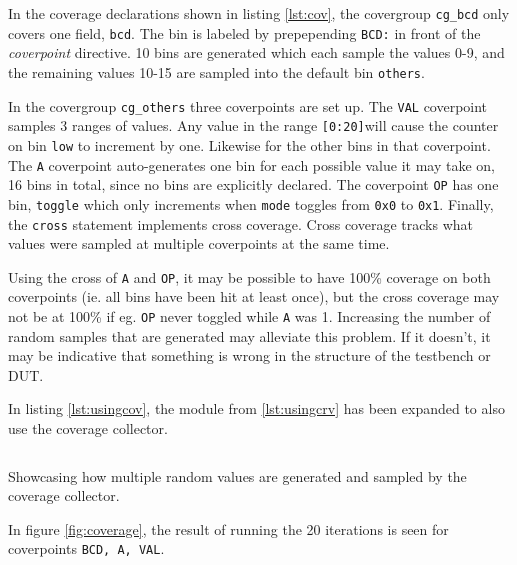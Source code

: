 \documentclass[conference]{IEEEtran}
\begin{document}
In the coverage declarations shown in listing \ref{lst:cov}, the covergroup \texttt{cg\_bcd} only covers one field, \texttt{bcd}. The bin is labeled by prepepending \texttt{BCD:} in front of the \textit{coverpoint} directive. 10 bins are generated which each sample the values 0-9, and the remaining values 10-15 are sampled into the default bin \texttt{others}. 

In the covergroup \texttt{cg\_others} three coverpoints are set up. The \texttt{VAL} coverpoint samples 3 ranges of values. Any value in the range \texttt{[0:20]}will cause the counter on bin \texttt{low} to increment by one. Likewise for the other bins in that coverpoint. The \texttt{A} coverpoint auto-generates one bin for each possible value it may take on, 16 bins in total, since no bins are explicitly declared. The coverpoint \texttt{OP} has one bin, \texttt{toggle} which only increments when \texttt{mode} toggles from \texttt{0x0} to \texttt{0x1}. Finally, the \texttt{cross} statement implements cross coverage. Cross coverage tracks what values were sampled at multiple coverpoints at the same time.

Using the cross of \texttt{A} and \texttt{OP}, it may be possible to have 100\% coverage on both coverpoints (ie. all bins have been hit at least once), but the cross coverage may not be at 100\% if eg. \texttt{OP} never toggled while \texttt{A} was 1. Increasing the number of random samples that are generated may alleviate this problem. If it doesn't, it may be indicative that something is wrong in the structure of the testbench or DUT.

In listing \ref{lst:usingcov}, the module from \cref{lst:usingcrv} has been expanded to also use the coverage collector.

\begin{listing}[htbp]
	\inputminted{systemverilog}{snippets/top.sv}
	\caption{Showcasing how multiple random values are generated and sampled by the coverage collector.}
	\label{lst:usingcov}
\end{listing}

In figure \ref{fig:coverage}, the result of running the 20 iterations is seen for coverpoints \texttt{BCD, A, VAL}. 
\end{document}
